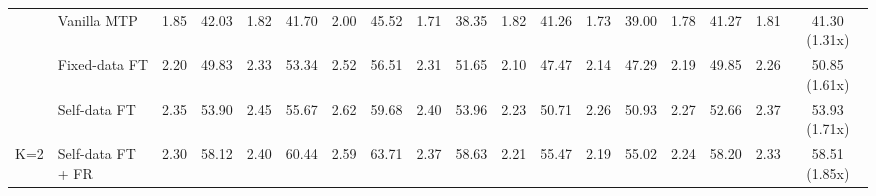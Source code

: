 \documentclass{article} %
\begin{document}
\begin{table}[ht]
\begin{adjustbox}{width=\textwidth}
\begin{tabular}{clcccccccccccccccc}
                                  & Vanilla MTP                                   & 1.85                         & 42.03                                  & 1.82                         & 41.70                                  & 2.00                         & 45.52                                  & 1.71                         & 38.35                                  & 1.82                         & 41.26                                  & 1.73                         & 39.00                                  & 1.78                         & 41.27                                  & 1.81                         & 41.30 (1.31x)                                  \\
                                  & Fixed-data FT                             & 2.20                         & 49.83                                  & 2.33                         & 53.34                                  & 2.52                         & 56.51                                  & 2.31                         & 51.65                                  & 2.10                         & 47.47                                  & 2.14                         & 47.29                                  & 2.19                         & 49.85                                  & 2.26                         & 50.85 (1.61x)                                  \\
                                  & Self-data FT                              & 2.35                         & 53.90                                  & 2.45                         & 55.67                                  & 2.62                         & 59.68                                  & 2.40                         & 53.96                                  & 2.23                         & 50.71                                  & 2.26                         & 50.93                                  & 2.27                         & 52.66                                  & 2.37                         & 53.93 (1.71x)                                  \\
\multirow{-4}{*}{K=2}             & Self-data FT + FR                         & 2.30                         & 58.12                                  & 2.40                         & 60.44                                  & 2.59                         & 63.71                                  & 2.37                         & 58.63                                  & 2.21                         & 55.47                                  & 2.19                         & 55.02                                  & 2.24                         & 58.20                                  & 2.33                         & 58.51 (1.85x)                                  \\ \midrule

\end{tabular}
\end{adjustbox}
\end{table}
\end{document}
